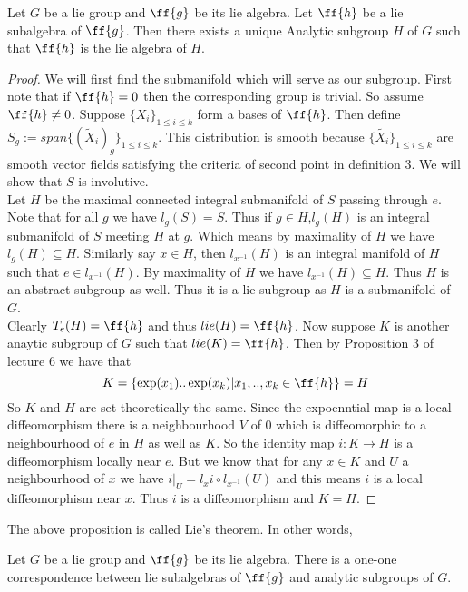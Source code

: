 \documentclass{article}
\begin{document}
\begin{proposition}
    Let $G$ be a lie group and $\ff{g}$ be its lie algebra. Let $\ff{h}$ be a lie subalgebra of $\ff{g}$. Then there exists a unique Analytic subgroup $H$ of $G$ such that $\ff{h}$ is the lie algebra of $H$.
\end{proposition}

\begin{proof}
    We will first find the submanifold which will serve as our subgroup. First note that if $\ff{h}=0$ then the corresponding group is trivial.
    So assume $\ff{h}\neq 0$. Suppose $\{X_i\}_{1\leq i\leq k}$ form a bases of $\ff{h}$. Then define $S_g:=span\{(\tilde{X}_i)_g\}_{1\leq i\leq k}$. 
    This distribution is smooth because $\{\tilde{X_i}\}_{1\leq i\leq k}$ are smooth vector fields satisfying the criteria of second point in definition 3.
    We will show that $S$ is involutive.\\
    Let $H$ be the maximal connected integral submanifold of $S$ passing through $e$. Note that for all $g$ we have $l_g(S)=S$. Thus if $g\in H$,$l_g(H)$ is an integral submanifold of $S$ meeting $H$ at $g$.
    Which means by maximality of $H$ we have $l_g(H)\subseteq H$. Similarly say $x\in H$, then $l_{x^{-1}}(H)$ is an integral manifold of $H$ such that $e\in l_{x^{-1}}(H)$. By maximality of $H$ we have $l_{x^{-1}}(H)\subseteq H$.
    Thus $H$ is an abstract subgroup as well. Thus it is a lie subgroup as $H$ is a submanifold of $G$.\\ 
    Clearly $T_e(H)=\ff{h}$ and thus $lie(H) = \ff{h}$. Now suppose $K$ is another anaytic subgroup of $G$ such that $lie(K)=\ff{h}$. Then by Proposition 3 of lecture 6 we have that $$K=\{\exp(x_1)..\exp(x_k)|x_1,..,x_k\in \ff{h}\} = H$$
    So $K$ and $H$ are set theoretically the same. Since the expoenntial map is a local diffeomorphism there is a neighbourhood $V$ of $0$ which is diffeomorphic to a neighbourhood of $e$ in $H$ as well as $K$. So the identity map $i:K\to H$
    is a diffeomorphism locally near $e$. But we know that for any $x\in K$ and $U$ a neighbourhood of $x$ we have $i|_U =l_x i\circ l_{x^{-1}}(U)$ and this means $i$ is a local diffeomorphism near $x$. Thus $i$ is a diffeomorphism and $K=H$.
\end{proof}

The above proposition is called Lie's theorem. In other words,

\begin{theorem}
    Let $G$ be a lie group and $\ff{g}$ be its lie algebra. There is a one-one correspondence between lie subalgebras of $\ff{g}$ and analytic subgroups of $G$.
\end{theorem}
\end{document}
